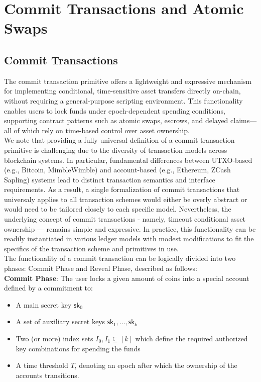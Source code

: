 
\section{Commit Transactions and Atomic Swaps}

\subsection{Commit Transactions}
The commit transaction primitive offers a lightweight and expressive mechanism for implementing conditional, time-sensitive asset transfers directly on-chain, without requiring a general-purpose scripting environment. This functionality enables users to lock funds under epoch-dependent spending conditions, supporting contract patterns such as atomic swaps, escrows, and delayed claims—all of which rely on time-based control over asset ownership. \\
We note that providing a fully universal definition of a commit transaction primitive is challenging due to the diversity of transaction models across blockchain systems. In particular, fundamental differences between UTXO-based (e.g., Bitcoin, MimbleWimble) and account-based (e.g., Ethereum, ZCash Sapling) systems lead to distinct transaction semantics and interface requirements. As a result, a single formalization of commit transactions that universaly applies to all transaction schemes would either be overly abstract or would need to be tailored closely to each specific model. Nevertheless, the underlying concept of commit transactions - namely, timeout conditional asset ownership — remains simple and expressive. In practice, this functionality can be readily instantiated in various ledger models with modest modifications to fit the specifics of the transaction scheme and primitives in use. \vspace{0.3em} \\
The functionality of a commit transaction can be logically divided into two phases: Commit Phase and Reveal Phase, described as follows: \\
\textbf{Commit Phase}: The user locks a given amount of coins into a special account defined by a commitment to:
    \begin{itemize}
        \item A main secret key $\mathsf{sk}_0$
	\item A set of auxiliary secret keys $\mathsf{sk}_1, \dots, \mathsf{sk}_k$
	\item Two (or more) index sets $I_0, I_1 \subseteq [k]$ which define the required authorized key combinations for spending the funds
	\item A time threshold $T$, denoting an epoch after which the ownership of the accounts transitions.
    \end{itemize}
